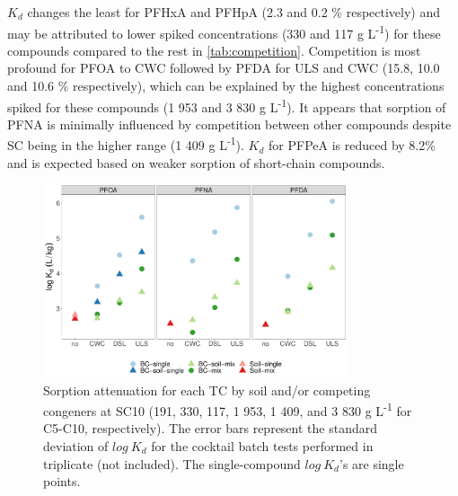 $K_d$ changes the least for PFHxA and PFHpA (2.3 and 0.2 \% respectively) and may be attributed to lower spiked concentrations (330 and 117 \textmu g L\textsuperscript{-1}) for these compounds compared to the rest in \cref{tab:competition}. Competition is most profound for PFOA to CWC followed by PFDA for ULS and CWC (15.8, 10.0 and 10.6 \% respectively), which can be explained by the highest concentrations spiked for these compounds (1 953 and 3 830 \textmu g L\textsuperscript{-1}). It appears that sorption of PFNA is minimally influenced by competition between other compounds despite SC being in the higher range (1 409 \textmu g L\textsuperscript{-1}). $K_d$ for PFPeA is reduced by 8.2\% and is expected based on weaker sorption of short-chain compounds.

\begin{figure}[htb]
    \centering
    \includegraphics[width=0.8\textwidth]{R/figs/C10.pdf}
    \caption{Sorption attenuation for each TC by soil and/or competing congeners at SC10 (191, 330, 117, 1 953, 1 409, and 3 830 \textmu g L\textsuperscript{-1} for C5-C10, respectively). The error bars represent the standard deviation of $log~K_d$ for the cocktail batch tests performed in triplicate (not included). The single-compound $log~K_d$'s are single points.}
    \label{fig:C10}
\end{figure}
